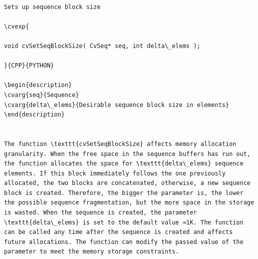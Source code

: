 \begin{verbatim}

Sets up sequence block size

\cvexp{

void cvSetSeqBlockSize( CvSeq* seq, int delta\_elems );

}{CPP}{PYTHON}

\begin{description}
\cvarg{seq}{Sequence}
\cvarg{delta\_elems}{Desirable sequence block size in elements}
\end{description}


The function \texttt{cvSetSeqBlockSize} affects memory allocation granularity. When the free space in the sequence buffers has run out, the function allocates the space for \texttt{delta\_elems} sequence elements. If this block immediately follows the one previously allocated, the two blocks are concatenated, otherwise, a new sequence block is created. Therefore, the bigger the parameter is, the lower the possible sequence fragmentation, but the more space in the storage is wasted. When the sequence is created, the parameter \texttt{delta\_elems} is set to the default value ≈1K. The function can be called any time after the sequence is created and affects future allocations. The function can modify the passed value of the parameter to meet the memory storage constraints.


\end{verbatim}
\label{SeqPush}
